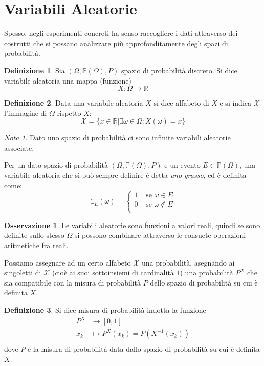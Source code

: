 \documentclass{article}
\theoremstyle{plain}
\theoremstyle{definition}
\newtheorem{definizione}{Definizione}[section]
\newtheorem{osservazione}{Osservazione}[section]
\theoremstyle{remark}
\newtheorem*{nota}{Nota}
\begin{document}
\section{Variabili Aleatorie} %
\label{sec:variabili_aleatorie}
Spesso, negli esperimenti concreti ha senso raccogliere i dati attraverso dei costrutti che si possano analizzare più approfonditamente degli spazi di probabilità.
\begin{definizione}
	Sia $(\Omega, \mathds{P}(\Omega), P)$ spazio di probabilità discreto. Si dice variabile aleatoria una mappa (funzione)
	\begin{equation*}
		X\colon \Omega\to\mathds{R}
	\end{equation*}
\end{definizione}
\begin{definizione}
	Data una variabile aleatoria $X$ si dice alfabeto di $X$ e si indica $\mathcal{X}$ l'immagine di $\Omega$ rispetto $X$:
	\begin{equation*}
		\mathcal{X}=\{x\in\mathds{R}\vert \exists \omega\in\Omega\colon X(\omega)=x\}
	\end{equation*}
\end{definizione}
\begin{nota}
	Dato uno spazio di probabilità ci sono infinite variabili aleatorie associate.
\end{nota}
Per un dato spazio di probabilità $(\Omega, \mathds{P}(\Omega), P)$ e un evento $E\in\mathds{P}(\Omega)$, una variabile aleatoria che si può sempre definire è detta \textit{uno grasso}, ed è definita come:
\begin{equation*}
	\mathds{1}_E(\omega)=
	\begin{cases}
		1&\text{ se }\omega\in E\\
		0&\text{ se }\omega\notin E\\
	\end{cases}
\end{equation*}
\begin{osservazione}
	Le variabili aleatorie sono funzioni a valori reali, quindi se sono definite sullo stesso $\Omega$ si possono combinare attraverso le consuete operazioni aritmetiche fra reali.
\end{osservazione}
Possiamo assegnare ad un certo alfabeto $\mathcal{X}$ una probabilità, asegnando ai singoletti di $\mathcal{X}$ (cioè ai suoi sottoinsiemi di cardinalità $1$) una probabilità $P^X$ che sia compatibile con la misura di probabilità $P$ dello spazio di probabilità su cui è definita $X$.
\begin{definizione}
	Si dice misura di probabilità indotta la funzione
	\begin{align*}
		P^X&\to [0,1]\\
		x_k&\mapsto P^X(x_k)=P(X^{-1}(x_k))\\
	\end{align*}
	dove $P$ è la misura di probabilità data dallo spazio di probabilità su cui è definita $X$.
\end{definizione}
\end{document}
